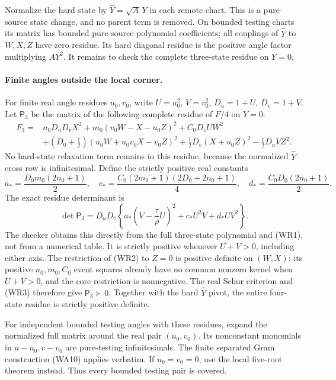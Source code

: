 Normalize the hard state by $\widehat Y=\sqrt A\,Y$ in each
remote chart. This is a pure-source state change, and no parent
term is removed. On bounded testing charts its matrix has bounded
pure-source polynomial coefficients; all couplings of
$\widehat Y$ to $W,X,Z$ have zero residue. Its hard diagonal
residue is the positive angle factor multiplying $AY^2$.
It remains to check the complete three-state residue on $Y=0$.

\paragraph{Finite angles outside the local corner.}
For finite real angle residues $u_0,v_0$, write $U=u_0^2$,
$V=v_0^2$, $D_u=1+U$, $D_v=1+V$. Let $\mathsf P_3$ be the
matrix of the following complete residue of $F/4$ on $Y=0$:
\[
 \begin{split}
 F_3={}&n_0D_uD_vX^2+m_0(v_0W-X-u_0Z)^2
                    +C_0D_vU W^2\\
 &+(D_0+\tfrac12)(u_0W+u_0v_0X-v_0Z)^2
       +\tfrac12D_v(X+u_0Z)^2-\tfrac12D_uVZ^2.
 \end{split}                                           \tag{WR2}
\]
No hard-state relaxation term remains in this residue, because
the normalized $\widehat Y$ cross row is infinitesimal. Define
the strictly positive real constants
\[
 a_*=\frac{D_0m_0(2n_0+1)}2,\quad
 c_* =\frac{C_0(2m_0+1)(2D_0+2n_0+1)}4,\quad
 d_* =\frac{C_0D_0(2n_0+1)}2.
\]
The exact residue determinant is
\[
 \det\mathsf P_3=D_uD_v
 \left\{a_*\left(V-\frac\tau\rho U\right)^2
                         +c_*U^2V+d_*UV^2\right\}.    \tag{WR3}
\]
The checker obtains this directly from the full three-state
polynomial and (WR1), not from a numerical table. It is strictly
positive whenever $U+V>0$, including either axis. The restriction
of (WR2) to $Z=0$ is positive definite on $(W,X)$: its positive
$n_0,m_0,C_0$ event squares already have no common nonzero kernel
when $U+V>0$, and the core restriction is nonnegative. The real
Schur criterion and (WR3) therefore give
$\mathsf P_3\succ0$. Together with the hard $\widehat Y$ pivot,
the entire four-state residue is strictly positive definite.

For independent bounded testing angles with these residues,
expand the normalized full matrix around the real pair
$(u_0,v_0)$. Its nonconstant monomials in $u-u_0,v-v_0$ are
pure-testing infinitesimals. The finite separated Gram construction
(WA10) applies verbatim. If $u_0=v_0=0$, use the local five-root
theorem instead. Thus every bounded testing pair is covered.

